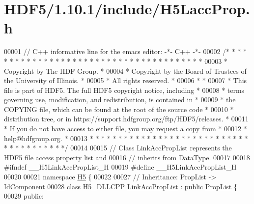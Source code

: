 \hypertarget{_h_d_f5_21_810_81_2include_2_h5_lacc_prop_8h_source}{}\section{H\+D\+F5/1.10.1/include/\+H5\+Lacc\+Prop.h}
\label{_h_d_f5_21_810_81_2include_2_h5_lacc_prop_8h_source}

\begin{DoxyCode}
00001 \textcolor{comment}{// C++ informative line for the emacs editor: -*- C++ -*-}
00002 \textcolor{comment}{/* * * * * * * * * * * * * * * * * * * * * * * * * * * * * * * * * * * * * * *}
00003 \textcolor{comment}{ * Copyright by The HDF Group.                                               *}
00004 \textcolor{comment}{ * Copyright by the Board of Trustees of the University of Illinois.         *}
00005 \textcolor{comment}{ * All rights reserved.                                                      *}
00006 \textcolor{comment}{ *                                                                           *}
00007 \textcolor{comment}{ * This file is part of HDF5.  The full HDF5 copyright notice, including     *}
00008 \textcolor{comment}{ * terms governing use, modification, and redistribution, is contained in    *}
00009 \textcolor{comment}{ * the COPYING file, which can be found at the root of the source code       *}
00010 \textcolor{comment}{ * distribution tree, or in https://support.hdfgroup.org/ftp/HDF5/releases.  *}
00011 \textcolor{comment}{ * If you do not have access to either file, you may request a copy from     *}
00012 \textcolor{comment}{ * help@hdfgroup.org.                                                        *}
00013 \textcolor{comment}{ * * * * * * * * * * * * * * * * * * * * * * * * * * * * * * * * * * * * * * */}
00014 
00015 \textcolor{comment}{// Class LinkAccPropList represents the HDF5 file access property list and}
00016 \textcolor{comment}{// inherits from DataType.}
00017 
00018 \textcolor{preprocessor}{#ifndef \_\_H5LinkAccPropList\_H}
00019 \textcolor{preprocessor}{#define \_\_H5LinkAccPropList\_H}
00020 
00021 \textcolor{keyword}{namespace }\hyperlink{namespace_h5}{H5} \{
00022 
00027 \textcolor{comment}{//  Inheritance: PropList -> IdComponent}
\hyperlink{class_h5_1_1_link_acc_prop_list}{00028} \textcolor{keyword}{class }H5\_DLLCPP \hyperlink{class_h5_1_1_link_acc_prop_list}{LinkAccPropList} : \textcolor{keyword}{public} \hyperlink{class_h5_1_1_prop_list}{PropList} \{
00029    \textcolor{keyword}{public}:

\end{DoxyCode}
